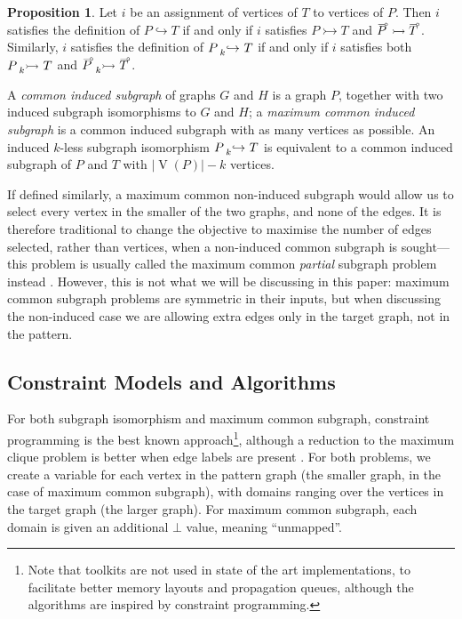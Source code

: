 \documentclass[letterpaper]{article}
\newcommand{\citep}[1]{\cite{#1}}
\theoremstyle{definition}
\newtheorem{proposition}{Proposition}
\newcommand{\lessnonind}[1]{\prescript{}{#1}{\rightarrowtail}\ }
\newcommand{\lessind}[1]{\prescript{}{#1}{\hookrightarrow}\ }
\newcommand{\V}{\operatorname{V}}
\newcommand{\loopcomp}[1]{\tset{\multimap}{#1}}
\newcommand{\tset}[2]{%
    \tikz[baseline=(X.base),inner sep=0pt,outer sep=0pt]{%
        \node[inner sep=0pt,outer sep=0pt] (X) {$#2$};
        \node[yshift=1.5pt,xshift=1pt] at (X.north) {$\scriptstyle#1$};
}}
\begin{document}
\begin{proposition}
    \label{prop:comp}
Let $i$ be an assignment of vertices of $T$ to vertices of $P$.  Then $i$ satisfies the definition of $P
\hookrightarrow T$ if and only if $i$ satisfies $P \rightarrowtail T$ and
$\loopcomp{P} \rightarrowtail \loopcomp{T}$.
Similarly, $i$ satisfies the definition of $P
\lessind{k} T$ if and only if $i$ satisfies both $P \lessnonind{k} T$ and
$\loopcomp{P}
\lessnonind{k} \loopcomp{T}$.
\end{proposition}

A \emph{common induced subgraph} of graphs $G$ and $H$ is a graph $P$, together with two induced subgraph
isomorphisms to $G$ and $H$; a \emph{maximum common induced subgraph} is a common induced subgraph with as
many vertices as possible. An induced $k$-less subgraph isomorphism $P \lessind{k} T$ is equivalent
to a common induced subgraph of $P$ and $T$ with $\left|\V(P)\right| - k$ vertices.

If defined similarly, a maximum common non-induced subgraph would allow us to select every vertex in
the smaller of the two graphs, and none of the edges. It is therefore traditional to change the
objective to maximise the number of edges selected, rather than vertices, when a non-induced common
subgraph is sought---this problem is usually called the maximum common \emph{partial} subgraph
problem instead \citep{DBLP:conf/cp/NdiayeS11}. However, this is not what we will be discussing in
this paper: maximum common subgraph problems are symmetric in their inputs, but when discussing the
non-induced case we are allowing extra edges only in the target graph, not in the pattern.

\subsection{Constraint Models and Algorithms}

For both subgraph isomorphism and maximum common subgraph, constraint programming is the best known
approach\footnote{Note that toolkits are not used in state of the art implementations, to facilitate
better memory layouts and propagation queues, although the algorithms are inspired by constraint
programming.}, although a reduction to the maximum clique problem is better when edge labels are
present \citep{DBLP:conf/cp/NdiayeS11,DBLP:conf/cp/McCreeshNPS16}. For both problems, we create a
variable for each vertex in the pattern graph (the smaller graph, in the case of maximum common
subgraph), with domains ranging over the vertices in the target graph (the larger graph). For
maximum common subgraph, each domain is given an additional $\bot$ value, meaning ``unmapped''.
\end{document}
